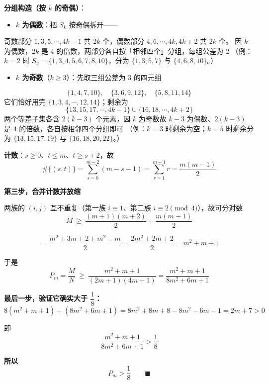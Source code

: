 \begin{answer}
\textbf{分组构造（按 $k$ 的奇偶）}：

\begin{itemize}
\item \textbf{$k$ 为偶数}：把 $S_k$ 按奇偶拆开——
\end{itemize}
  奇数部分 $1,3,5,\cdots,4k-1$ 共 $2k$ 个，偶数部分 $4,6,\cdots,4k,4k+2$ 共 $2k$ 个。
  因 $k$ 为偶数，$2k$ 是 $4$ 的倍数，两部分各自按「相邻四个」分组，每组公差为 $2$ 
  （例：$k=2$ 时 $S_2=\{1,3,4,5,6,7,8,10\}$，分为 $\{1,3,5,7\}$ 与 $\{4,6,8,10\}$。）

\begin{itemize}
\item \textbf{$k$ 为奇数}（$k\ge3$）：先取三组公差为 $3$ 的四元组
\end{itemize}
\nopagebreak[4]
\[\{1,4,7,10\},\quad\{3,6,9,12\},\quad\{5,8,11,14\}\]
  它们恰好用完 $\{1,3,4,\cdots,12,14\}$；剩余为
\nopagebreak[4]
\[\{13,15,17,\cdots,4k-1\}\cup\{16,18,\cdots,4k+2\}\]
  两个等差子集各含 $2(k-3)$ 个元素，因 $k$ 为奇数故 $k-3$ 为偶数、$2(k-3)$ 是 $4$ 的倍数，各自按相邻四个分组即可 
  （例：$k=3$ 时剩余为空；$k=5$ 时剩余分为 $\{13,15,17,19\}$ 与 $\{16,18,20,22\}$。）

\textbf{计数}：$s\ge0$、$t\le m$、$t\ge s+2$，故
\nopagebreak[4]
\[\#\{(s,t)\}=\sum_{s=0}^{m-2}\left(m-s-1\right)=\sum_{r=1}^{m-1}r=\frac{m(m-1)}2\]

\par\medskip

\textbf{第三步，合并计数并放缩}

两族的 $(i,j)$ 互不重复（第一族 $i\equiv1$、第二族 $i\equiv2\pmod4$），故可分对数
\nopagebreak[4]
\[M\ \ge\ \frac{(m+1)(m+2)}2+\frac{m(m-1)}2\]

\nopagebreak[4]
\[=\frac{m^{2}+3m+2+m^{2}-m}2=\frac{2m^{2}+2m+2}2=m^{2}+m+1\]

于是
\nopagebreak[4]
\[P_m=\frac{M}{N}\ \ge\ \frac{m^{2}+m+1}{(2m+1)(4m+1)}=\frac{m^{2}+m+1}{8m^{2}+6m+1}\]

\textbf{最后一步，验证它确实大于 $\dfrac18$：}
\nopagebreak[4]
\[8\left(m^{2}+m+1\right)-\left(8m^{2}+6m+1\right)=8m^{2}+8m+8-8m^{2}-6m-1=2m+7>0\]

即
\nopagebreak[4]
\[\frac{m^{2}+m+1}{8m^{2}+6m+1}>\frac18\]

\textbf{所以}
\nopagebreak[4]
\[P_m>\frac18\qquad\blacksquare\]


\end{answer}
